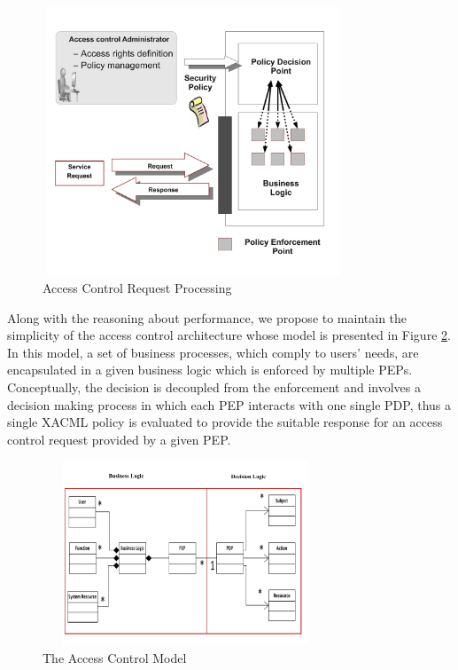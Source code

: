 \begin{figure}[!h]
\begin{center}
\includegraphics[width=9cm, height=8cm]{business-logic}
\caption{Access Control Request Processing}
\label{pep-pdp}
\end{center}
\end{figure}

Along with the reasoning about performance, we propose to maintain the simplicity of the access control architecture whose model 
is presented in Figure \ref{model}. In this model, a set of business processes, which comply to users' needs, are encapsulated in a given business logic 
which is enforced by multiple PEPs. Conceptually, the decision is decoupled from the enforcement and involves a decision making process in which each PEP 
interacts with one single PDP, thus a single XACML policy is evaluated to provide the suitable response for an access control request provided by a given PEP. 
\begin{figure}[!h]
\begin{center}
\includegraphics[height=5.5cm,width=8.5cm]{model}
\caption{The Access Control Model}
\label{model}
\end{center}
\end{figure}

